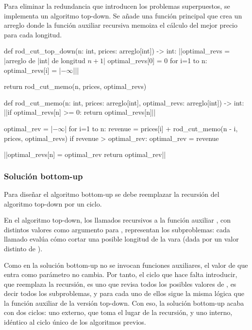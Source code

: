 Para eliminar la redundancia que introducen los problemas superpuestos, se implementa un algoritmo top-down. Se añade una función principal que crea un arreglo donde la función auxiliar recursiva memoiza el cálculo del mejor precio para cada longitud.
\begin{pseudocode}
def rod_cut_top_down(n: int, prices: arreglo[int]) -> int:
    ||optimal_revs = |\textrm{arreglo de }|int|\textrm{ de longitud $n+1$}|
    optimal_revs[0] = 0
    for i=1 to n:
        optimal_revs[i] = |$-\infty$|||

    return rod_cut_memo(n, prices, optimal_revs)

def rod_cut_memo(n: int, prices: arreglo[int], optimal_revs: arreglo[int]) -> int:
    ||if optimal_revs[n] >= 0:
        return optimal_revs[n]||

    optimal_rev = |$-\infty$|
    for i=1 to n:
        revenue = prices[i] + rod_cut_memo(n - i, prices, optimal_revs)
        if revenue > optimal_rev:
            optimal_rev = revenue

    ||optimal_revs[n] = optimal_rev
    return optimal_rev||
\end{pseudocode}
\begin{annotations}
\end{annotations}

\subsubsection{Solución bottom-up}

Para diseñar el algoritmo bottom-up se debe reemplazar la recursión del algoritmo top-down por un ciclo. 

En el algoritmo top-down, los llamados recursivos a la función auxiliar , con distintos valores como argumento para , representan los subproblemas: cada llamado evalúa cómo cortar una posible longitud de la vara (dada por un valor distinto de ).

Como en la solución bottom-up no se invocan funciones auxiliares, el valor de  que entra como parámetro no cambia. Por tanto, el ciclo que hace falta introducir, que reemplaza la recursión, es uno que revisa todos los posibles valores de , es decir todos los subproblemas, y para cada uno de ellos sigue la misma lógica que la función auxiliar de la versión top-down. Con eso, la solución bottom-up acaba con dos ciclos: uno externo, que toma el lugar de la recursión, y uno interno, idéntico al ciclo único de los algoritmos previos.

